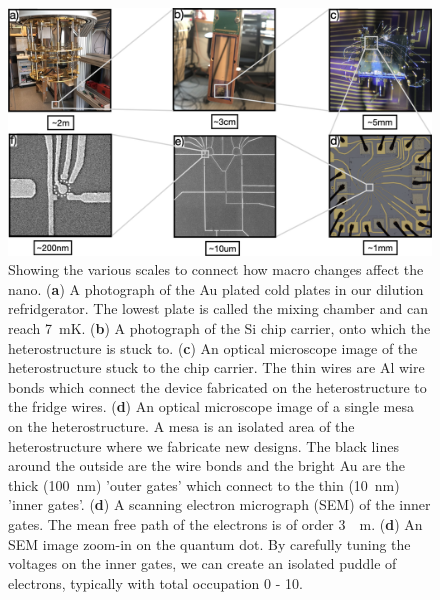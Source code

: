 \begin{figure}[ht]
  \begin{center}
    \includegraphics[width=1.0\textwidth]{figures/ch1/crop_PosterFiguresMaster.001.png}
    \caption[Dilution fridge to quantum dot scale breakdown]{\label{fig:ch1/scale_breakdown} 
    Showing the various scales to connect how macro changes affect the nano. (\textbf{a}) A photograph of the Au plated cold plates in our dilution refridgerator. The lowest plate is called the mixing chamber and can reach \qty{7}{mK}. (\textbf{b}) A photograph of the Si chip carrier, onto which the heterostructure is stuck to. (\textbf{c}) An optical microscope image of the heterostructure stuck to the chip carrier. The thin wires are Al wire bonds which connect the device fabricated on the heterostructure to the fridge wires. (\textbf{d}) An optical microscope image of a single mesa on the heterostructure. A mesa is an isolated area of the heterostructure where we fabricate new designs. The black lines around the outside are the wire bonds and the bright Au are the thick (\qty{100}{nm}) 'outer gates' which connect to the thin (\qty{10}{nm}) 'inner gates'. (\textbf{d}) A scanning electron micrograph (SEM) of the inner gates. The mean free path of the electrons is of order \qty{3}{\mu m}.  (\textbf{d}) An SEM image zoom-in on the quantum dot. By carefully tuning the voltages on the inner gates, we can create an isolated puddle of electrons, typically with total occupation 0 - 10.  
      }
  \end{center}
\end{figure}




